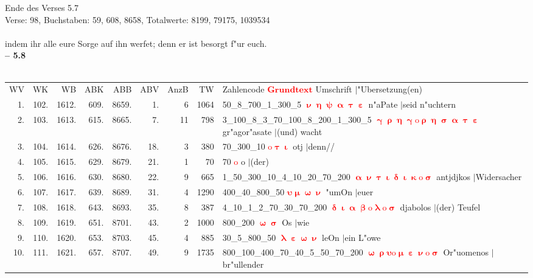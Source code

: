 \documentclass[a4paper,10pt,landscape]{article}
\begin{document}
Ende des Verses 5.7\\
Verse: 98, Buchstaben: 59, 608, 8658, Totalwerte: 8199, 79175, 1039534\\
\\
indem ihr alle eure Sorge auf ihn werfet; denn er ist besorgt f"ur euch.\\
\newpage 
{\bf -- 5.8}\\
\medskip \\
\begin{tabular}{rrrrrrrrp{120mm}}
WV&WK&WB&ABK&ABB&ABV&AnzB&TW&Zahlencode \textcolor{red}{$\boldsymbol{Grundtext}$} Umschrift $|$"Ubersetzung(en)\\
1.&102.&1612.&609.&8659.&1.&6&1064&50\_8\_700\_1\_300\_5 \textcolor{red}{$\boldsymbol{\upnu\upeta\uppsi\upalpha\uptau\upepsilon}$} n"aPate $|$seid n"uchtern\\
2.&103.&1613.&615.&8665.&7.&11&798&3\_100\_8\_3\_70\_100\_8\_200\_1\_300\_5 \textcolor{red}{$\boldsymbol{\upgamma\uprho\upeta\upgamma\mathrm{o}\uprho\upeta\upsigma\upalpha\uptau\upepsilon}$} gr"agor"asate $|$(und) wacht\\
3.&104.&1614.&626.&8676.&18.&3&380&70\_300\_10 \textcolor{red}{$\boldsymbol{\mathrm{o}\uptau\upiota}$} otj $|$denn//\\
4.&105.&1615.&629.&8679.&21.&1&70&70 \textcolor{red}{$\boldsymbol{\mathrm{o}}$} o $|$(der)\\
5.&106.&1616.&630.&8680.&22.&9&665&1\_50\_300\_10\_4\_10\_20\_70\_200 \textcolor{red}{$\boldsymbol{\upalpha\upnu\uptau\upiota\updelta\upiota\upkappa\mathrm{o}\upsigma}$} antjdjkos $|$Widersacher\\
6.&107.&1617.&639.&8689.&31.&4&1290&400\_40\_800\_50 \textcolor{red}{$\boldsymbol{\upsilon\upmu\upomega\upnu}$} "umOn $|$euer\\
7.&108.&1618.&643.&8693.&35.&8&387&4\_10\_1\_2\_70\_30\_70\_200 \textcolor{red}{$\boldsymbol{\updelta\upiota\upalpha\upbeta\mathrm{o}\uplambda\mathrm{o}\upsigma}$} djabolos $|$(der) Teufel\\
8.&109.&1619.&651.&8701.&43.&2&1000&800\_200 \textcolor{red}{$\boldsymbol{\upomega\upsigma}$} Os $|$wie\\
9.&110.&1620.&653.&8703.&45.&4&885&30\_5\_800\_50 \textcolor{red}{$\boldsymbol{\uplambda\upepsilon\upomega\upnu}$} leOn $|$ein L"owe\\
10.&111.&1621.&657.&8707.&49.&9&1735&800\_100\_400\_70\_40\_5\_50\_70\_200 \textcolor{red}{$\boldsymbol{\upomega\uprho\upsilon\mathrm{o}\upmu\upepsilon\upnu\mathrm{o}\upsigma}$} Or"uomenos $|$br"ullender\\

\end{tabular}
\end{document}

